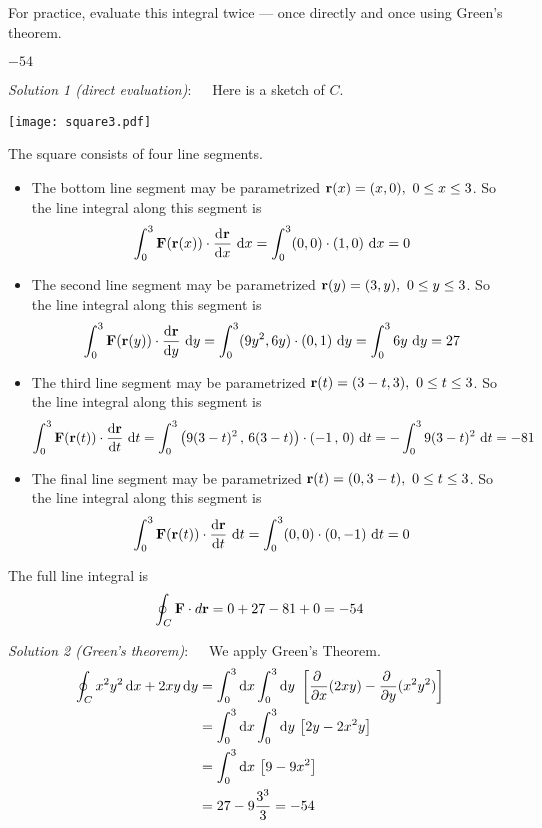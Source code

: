 \begin{hint} 
For practice, evaluate this integral twice --- once directly and once
using Green's theorem.
\end{hint}

\begin{answer} 
$-54$
\end{answer}


\begin{solution}
\emph{Solution 1 (direct evaluation)}:\ \ \ 
Here is a sketch of $C$.
\begin{center}
     \texttt{[image: square3.pdf]}
\end{center}
The square consists of four line segments.
\begin{itemize}\itemsep1pt \parskip0pt  %
\item
The bottom line segment may be parametrized
$\mathbf{r}(x)=(x,0),\ 0\le x\le 3$. So the line integral along
this segment is
\begin{equation*}
\int_0^3 \vF(\vr(x))\cdot\diff{\vr}{x}\ \dee{x}
=\int_0^3 (0, 0)\cdot(1, 0)\ \dee{x}
=0
\end{equation*}
\item
The second line segment may be parametrized
$\mathbf{r}(y)=(3,y),\ 0\le y\le 3$. So the line integral along
this segment is
\begin{equation*}
\int_0^3 \vF(\vr(y))\cdot\diff{\vr}{y}\ \dee{y}
=\int_0^3 (9y^2, 6y)\cdot(0, 1)\ \dee{y}
=\int_0^3 6y\ \dee{y}
=27
\end{equation*}
\item
The third line segment may be parametrized
$\mathbf{r}(t)=(3-t,3),\ 0\le t\le 3$. So the line integral along
this segment is
\begin{equation*}
\int_0^3 \vF(\vr(t))\cdot\diff{\vr}{t}\ \dee{t}
=\int_0^3 \big(9(3-t)^2\,,\, 6(3-t)\big)\cdot(-1\,,\,0)\ \dee{t}
=-\int_0^3 9(3-t)^2\ \dee{t}
=-81
\end{equation*}
\item
The final line segment may be parametrized
$\mathbf{r}(t)=(0,3-t),\ 0\le t\le 3$. So the line integral along
this segment is
\begin{equation*}
\int_0^3 \vF(\vr(t))\cdot\diff{\vr}{t}\ \dee{t}
=\int_0^3 (0, 0)\cdot(0, -1)\ \dee{t}
=0
\end{equation*}
\end{itemize}
The full line integral is
\begin{equation*}
\oint_C\mathbf{F}\cdot d\mathbf{r}=0+27-81+0=-54
\end{equation*}


\emph{Solution 2 (Green's theorem)}:\ \ \ 
 We apply Green's Theorem. 
\begin{align*}
\oint_C x^2y^2\,\dee{x}+2xy\,\dee{y}
&=\int_0^3\dee{x}\int_0^3 \dee{y}\ 
            \left[\pdiff{}{x}(2xy)-\pdiff{}{y}(x^2y^2)\right]\\
&=\int_0^3\dee{x}\int_0^3 \dee{y}\ \big[2y-2x^2y\big]\\
&=\int_0^3\dee{x}\ \big[9-9x^2\big]\\
&=27-9\frac{3^3}{3}=-54
\end{align*}
\end{solution}



